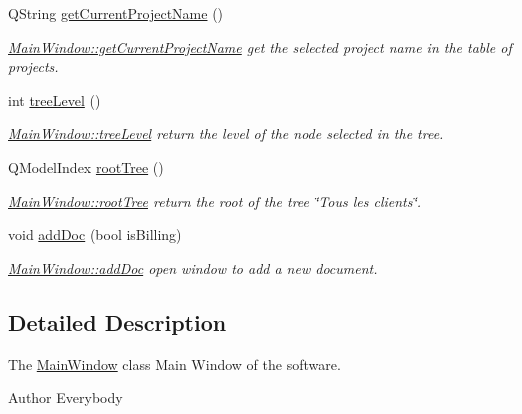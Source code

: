 \begin{DoxyCompactItemize}
Q\-String \hyperlink{classGui_1_1MainWindow_af83b009038b41bc676d15cb9bcfd5a39}{get\-Current\-Project\-Name} ()
\begin{DoxyCompactList}\small\item\em \hyperlink{classGui_1_1MainWindow_af83b009038b41bc676d15cb9bcfd5a39}{Main\-Window\-::get\-Current\-Project\-Name} get the selected project name in the table of projects. \end{DoxyCompactList}\item 
int \hyperlink{classGui_1_1MainWindow_a382370c8f119d99d409b1b5708a3e846}{tree\-Level} ()
\begin{DoxyCompactList}\small\item\em \hyperlink{classGui_1_1MainWindow_a382370c8f119d99d409b1b5708a3e846}{Main\-Window\-::tree\-Level} return the level of the node selected in the tree. \end{DoxyCompactList}\item 
Q\-Model\-Index \hyperlink{classGui_1_1MainWindow_ad2b58d18473d125b431ee0974c905748}{root\-Tree} ()
\begin{DoxyCompactList}\small\item\em \hyperlink{classGui_1_1MainWindow_ad2b58d18473d125b431ee0974c905748}{Main\-Window\-::root\-Tree} return the root of the tree \char`\"{}\-Tous les clients\char`\"{}. \end{DoxyCompactList}\item 
void \hyperlink{classGui_1_1MainWindow_adf04c63032d4014163797ca73041511f}{add\-Doc} (bool is\-Billing)
\begin{DoxyCompactList}\small\item\em \hyperlink{classGui_1_1MainWindow_adf04c63032d4014163797ca73041511f}{Main\-Window\-::add\-Doc} open window to add a new document. \end{DoxyCompactList}\end{DoxyCompactItemize}


\subsection{Detailed Description}
The \hyperlink{classGui_1_1MainWindow}{Main\-Window} class Main Window of the software. 

\begin{DoxyAuthor}{Author}
Everybody 
\end{DoxyAuthor}


